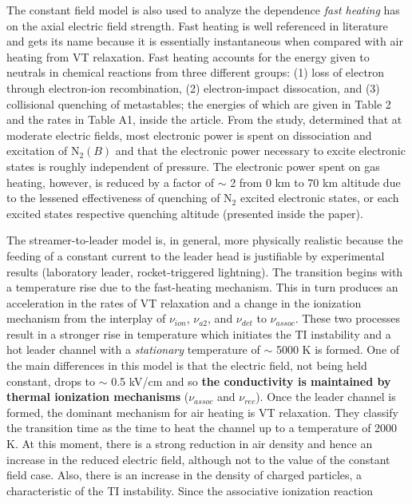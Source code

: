 \documentclass[]{article}
\begin{document}
	The constant field model is also used to analyze the dependence \textit{fast heating} has on the axial electric field strength. Fast heating is well referenced in literature and gets its name because it is essentially instantaneous when compared with air heating from VT relaxation. Fast heating accounts for the energy given to neutrals in chemical reactions from three different groups: (1) loss of electron through electron-ion recombination, (2) electron-impact dissocation, and (3) collisional quenching of metastables; the energies of which are given in Table 2 and the rates in Table A1, inside the article. From the study, \citet{daSilva:2013a} determined that at moderate electric fields, most electronic power is spent on dissociation and excitation of N$_2(B)$ and that the electronic power necessary to excite electronic states is roughly independent of pressure. The electronic power spent on gas heating, however, is reduced by a factor of $\sim$ 2 from 0 km to 70 km altitude due to the lessened effectiveness of quenching of N$_2$ excited electronic states, or each excited states respective quenching altitude (presented inside the paper). 
	
	The streamer-to-leader model is, in general, more physically realistic because the feeding of a constant current to the leader head is justifiable by experimental results (laboratory leader, rocket-triggered lightning). The transition begins with a temperature rise due to the fast-heating mechanism. This in turn produces an acceleration in the rates of VT relaxation and a change in the ionization mechanism from the interplay of $\nu_{ion}$, $\nu_{a2}$, and $\nu_{det}$ to $\nu_{assoc}$. These two processes result in a stronger rise in temperature which initiates the TI instability and a hot leader channel with a \textit{stationary} temperature of $\sim$ 5000 K is formed. One of the main differences in this model is that the electric field, not being held constant, drops to $\sim$ 0.5 kV/cm and so \textbf{the conductivity is maintained by thermal ionization mechanisms} ($\nu_{assoc}$ and $\nu_{rec}$). Once the leader channel is formed, the dominant mechanism for air heating is VT relaxation. They classify the transition time as the time to heat the channel up to a temperature of 2000 K. At this moment, there is a strong reduction in air density and hence an increase in the reduced electric field, although not to the value of the constant field case. Also, there is an increase in the density of charged particles, a characteristic of the TI instability. Since the associative ionization reaction
	
\end{document}
